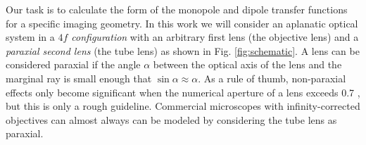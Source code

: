 \documentclass[]{osa-article}
\let\originalleft\left
\let\originalright\right
\renewcommand{\left}{\mathopen{}\mathclose\bgroup\originalleft}
\renewcommand{\right}{\aftergroup\egroup\originalright}
\providecommand{\mb}[1]{\mathbf{#1}}
\providecommand{\msf}[1]{\mathsf{#1}}
\providecommand{\so}{\mathbf{\hat{s}}_o}
\providecommand{\mbb}[1]{\mathbb{#1}}
\providecommand{\bs}[1]{\boldsymbol{#1}}
\providecommand{\bv}{\bs{\nu}}
\providecommand{\add}[1]{\textcolor{blue}{\uwave{#1}}}
\providecommand{\rem}[1]{\textcolor{red}{\sout{#1}}}
\begin{document}

Our task is to calculate the form of the monopole and dipole transfer
  functions for a specific imaging geometry. In this work we will consider an
aplanatic optical system in a \textit{$\mathit{4}f$ configuration} with an
arbitrary first lens (the objective lens) and a \textit{paraxial second lens}
(the tube lens) as shown in Fig. \ref{fig:schematic}. A lens can be considered
paraxial if the angle $\alpha$ between the optical axis of the lens and the
marginal ray is small enough that $\sin\alpha \approx \alpha$. As a rule of
thumb, non-paraxial effects only become significant when the numerical aperture
of a lens exceeds 0.7 \cite[ch.~6]{gu2000}, but this is only a rough guideline.
Commercial microscopes with infinity-corrected objectives can almost always can
be modeled by considering the tube lens as paraxial.

\end{document}
